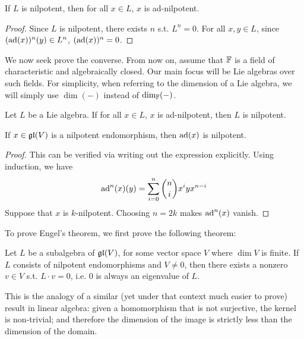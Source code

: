 \documentclass{article}
\begin{document}
\begin{lemma}\label{lem: nilpotent algebra implies every element is ad-nilpotent}
    If $L$ is nilpotent, then for all $x \in L$, $x$ is ad-nilpotent.
\end{lemma}

\begin{proof}
    Since $L$ is nilpotent, there exists $n$ s.t. $L^n = 0$. For all $x, y \in L$, since $(\operatorname{ad}(x))^n (y) \in L^n$, $(\operatorname{ad}(x))^n = 0$.
\end{proof}

\textstart
We now seek prove the converse. From now on, assume that $\mathbb{F}$ is a field of characteristic and algebraically closed. Our main focus will be Lie algebras over such fields. For simplicity, when referring to the dimension of a Lie algebra, we will simply use $\dim (-)$ instead of $\dim_{\mathbb{F}} (-)$.

\begin{theorem}[Engel]\label{thm: Engel}
    Let $L$ be a Lie algebra. If for all $x \in L$, $x$ is ad-nilpotent, then $L$ is nilpotent.
\end{theorem}

\begin{lemma}\label{lem: nilpotent implies ad-nilpotent}
    If $x \in \mathfrak{gl}(V)$ is a nilpotent endomorphism, then $\operatorname{ad}(x)$ is nilpotent.
\end{lemma}

\begin{proof}
    This can be verified via writing out the expression explicitly. Using induction, we have
    \[
        \operatorname{ad}^n(x) (y) = \sum_{i = 0}^n \binom{n}{i} x^i y x^{n-i}
    \]
    Suppose that $x$ is $k$-nilpotent. Choosing $n = 2k$ makes $\operatorname{ad}^n(x)$ vanish.
\end{proof}

To prove Engel's theorem, we first prove the following theorem:

\begin{theorem}\label{thm: 0 is eigenvalue of lie algebra of nilpotent endomorphisms}
    Let $L$ be a subalgebra of $\mathfrak{gl}(V)$, for some vector space $V$ where $\dim V$ is finite. If $L$ consists of nilpotent endomorphisms and $V \neq 0$, then there exists a nonzero $v \in V$ s.t. $L \cdot v = 0$, i.e. 0 is always an eigenvalue of $L$.
\end{theorem}
\nogap
\begin{remark}
    This is the analogy of a similar (yet under that context much easier to prove) result in linear algebra: given a homomorphism that is not surjective, the kernel is non-trivial; and therefore the dimension of the image is strictly less than the dimension of the domain.
\end{remark}
\end{document}
